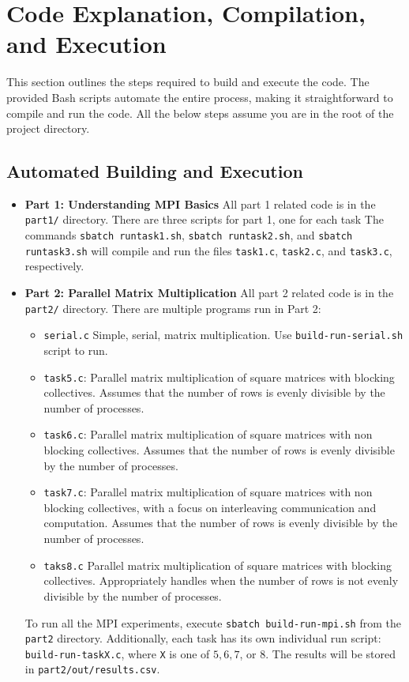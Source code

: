 \documentclass{article}
\begin{document}
\section{Code Explanation, Compilation, and Execution}

This section outlines the steps required to build and execute the code. The provided Bash scripts automate the entire process, 
making it straightforward to compile and run the code. All the below steps assume 
you are in the root of the project directory.

\subsection{Automated Building and Execution}
\begin{itemize}
    \item \textbf{Part 1: Understanding MPI Basics} 
    All part 1 related code is in the \texttt{part1/} directory.
    There are three scripts for part 1, one for each task
    The commands \texttt{sbatch runtask1.sh}, \texttt{sbatch runtask2.sh}, 
    and \texttt{sbatch runtask3.sh} will compile and run the files 
    \texttt{task1.c}, \texttt{task2.c}, and \texttt{task3.c}, respectively.
    
    \item \textbf{Part 2: Parallel Matrix Multiplication}
    All part 2 related code is in the \texttt{part2/} directory.
    There are multiple programs run in Part 2: 
    \begin{itemize}
        \item \texttt{serial.c} Simple, serial, matrix multiplication. Use \texttt{build-run-serial.sh} script to run.
        \item \texttt{task5.c}: Parallel matrix multiplication of square matrices with blocking collectives. 
        Assumes that the number of rows is evenly divisible by the number of processes.
        \item \texttt{task6.c}: Parallel matrix multiplication of square matrices with non blocking collectives. 
        Assumes that the number of rows is evenly divisible by the number of processes.
        \item \texttt{task7.c}:  Parallel matrix multiplication of square matrices with non blocking collectives, 
        with a focus on interleaving communication and computation. Assumes that the number of rows is evenly divisible by the number of processes.
        \item \texttt{taks8.c} Parallel matrix multiplication of square matrices with blocking collectives. 
        Appropriately handles when the number of rows is not evenly divisible by the number of processes.
    \end{itemize}
    To run all the MPI experiments, execute \texttt{sbatch build-run-mpi.sh} from the \texttt{part2} directory. Additionally, 
    each task has its own individual run script: \texttt{build-run-taskX.c}, where \texttt{X} is one of $5,6,7$, or $8$.
    The results will be stored in \texttt{part2/out/results.csv}.
\end{itemize}
\end{document}
